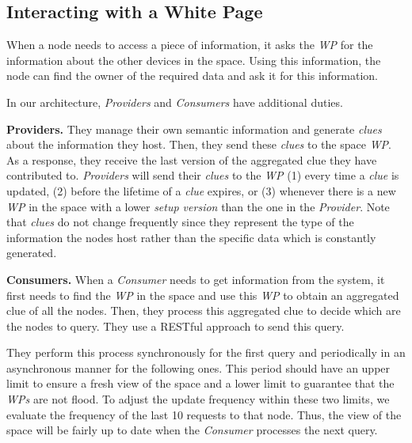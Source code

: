 \subsection{Interacting with a White Page}
\label{sec:interacting}
When a node needs to access a piece of information, it asks the \emph{WP} for the information about the other devices in the space.
Using this information, the node can find the owner of the required data and ask it for this information.

In our architecture, \emph{Providers} and \emph{Consumers} have additional duties.

\noindent\textbf{Providers.}
They manage their own semantic information and generate \emph{clues} about the information they host.
Then, they send these \emph{clues} to the space \emph{WP}.
As a response, they receive the last version of the aggregated clue they have contributed to.
\emph{Providers} will send their \emph{clues} to the \emph{WP}
(1) every time a \emph{clue} is updated,
(2) before the lifetime of a \emph{clue} expires, or
(3) whenever there is a new \emph{WP} in the space with a lower \emph{setup version} than the one in the \emph{Provider}.
Note that \emph{clues} do not change frequently since they represent the type of the information the nodes host rather than the specific data which is constantly generated.

\noindent\textbf{Consumers.}
When a \emph{Consumer} needs to get information from the system, it first needs to find the \emph{WP} in the space and use this \emph{WP} to obtain an aggregated clue of all the nodes.
Then, they process this aggregated clue to decide which are the nodes to query.
They use a RESTful approach to send this query.

They perform this process synchronously for the first query and periodically in an asynchronous manner for the following ones.
This period should have an upper limit to ensure a fresh view of the space and a lower limit to guarantee that the \emph{WPs} are not flood.
To adjust the update frequency within these two limits, we evaluate the frequency of the last 10 requests to that node.
Thus, the view of the space will be fairly up to date when the \emph{Consumer} processes the next query.

